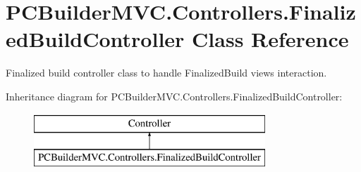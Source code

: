 \hypertarget{class_p_c_builder_m_v_c_1_1_controllers_1_1_finalized_build_controller}{}\section{P\+C\+Builder\+M\+V\+C.\+Controllers.\+Finalized\+Build\+Controller Class Reference}
\label{class_p_c_builder_m_v_c_1_1_controllers_1_1_finalized_build_controller}


Finalized build controller class to handle Finalized\+Build views interaction.  


Inheritance diagram for P\+C\+Builder\+M\+V\+C.\+Controllers.\+Finalized\+Build\+Controller\+:\begin{figure}[H]
\begin{center}
\leavevmode
\includegraphics[height=2.000000cm]{class_p_c_builder_m_v_c_1_1_controllers_1_1_finalized_build_controller}
\end{center}
\end{figure}

